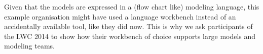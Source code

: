 \documentclass[11pt]{article} %
\begin{document}
Given that the models are expressed in a (flow chart like) modeling language, this example organisation might have used a language workbench instead of an accidentally available tool, like they did now. This is why we ask participants of the LWC 2014 to show how their workbench of choice supports large models and modeling teams.
\end{document}
